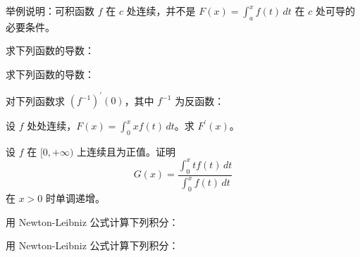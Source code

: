 \newpage
\noindent\begin{minipage}{\textwidth}
举例说明：可积函数 $f$ 在 $c$ 处连续，并不是 $F(x)=\int_a^x f(t)\,dt$ 在 $c$ 处可导的必要条件。
\end{minipage}\par\vfill
\noindent\begin{minipage}{\textwidth}
求下列函数的导数：
\end{minipage}\par\vfill
\noindent\begin{minipage}{\textwidth}
求下列函数的导数：
\end{minipage}\par\vfill
\noindent\begin{minipage}{\textwidth}
对下列函数求 $(f^{-1})^{\prime}(0)$，其中 $f^{-1}$ 为反函数：
\end{minipage}\par\vfill
\newpage
\noindent\begin{minipage}{\textwidth}
设 $f$ 处处连续，$F(x)=\int_0^x x f(t)\,dt$。求 $F^{\prime}(x)$。
\end{minipage}\par\vfill
\noindent\begin{minipage}{\textwidth}
设 $f$ 在 $[0,+\infty)$ 上连续且为正值。证明\[G(x)=\frac{\int_0^x t f(t)\,dt}{\int_0^x f(t)\,dt}\]在 $x>0$ 时单调递增。
\end{minipage}\par\vfill
\noindent\begin{minipage}{\textwidth}
用 Newton-Leibniz 公式计算下列积分：
\end{minipage}\par\vfill
\noindent\begin{minipage}{\textwidth}
用 Newton-Leibniz 公式计算下列积分：
\end{minipage}\par\vfill
